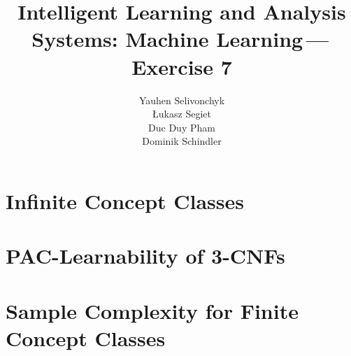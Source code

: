 \documentclass[a4paper]{article}
\newcommand{\exnumber}{7}
\begin{document}
\title{Intelligent Learning and Analysis Systems: Machine Learning\,---\,Exercise \exnumber}
\author{Yauhen Selivonchyk\\ {\L}ukasz Segiet\\Duc Duy Pham\\Dominik Schindler}

\maketitle

\section{Infinite Concept Classes}


\section{PAC-Learnability of 3-CNFs}


\section{Sample Complexity for Finite Concept Classes}

\end{document}
